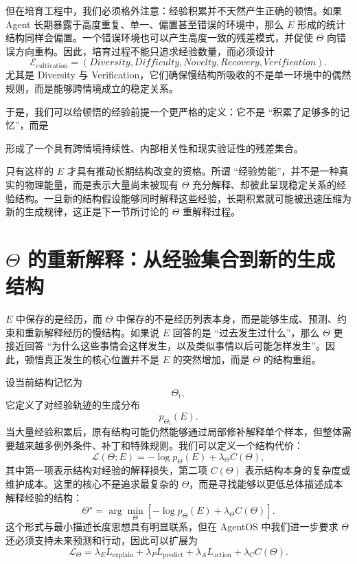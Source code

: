 但在培育工程中，我们必须格外注意：经验积累并不天然产生正确的顿悟。如果 Agent 长期暴露于高度重复、单一、偏置甚至错误的环境中，那么 $E$ 形成的统计结构同样会偏置。一个错误环境也可以产生高度一致的残差模式，并促使 $\Theta$ 向错误方向重构。因此，培育过程不能只追求经验数量，而必须设计
\[
\mathcal E_{\mathrm{cultivation}}
=
(
Diversity,
Difficulty,
Novelty,
Recovery,
Verification
).
\]
尤其是 Diversity 与 Verification，它们确保慢结构所吸收的不是单一环境中的偶然规则，而是能够跨情境成立的稳定关系。

于是，我们可以给顿悟的经验前提一个更严格的定义：它不是 ``积累了足够多的记忆''，而是
\begin{definition*}
形成了一个具有跨情境持续性、内部相关性和现实验证性的残差集合。
\end{definition*}
只有这样的 $E$ 才具有推动长期结构改变的资格。所谓 ``经验势能''，并不是一种真实的物理能量，而是表示大量尚未被现有 $\Theta$ 充分解释、却彼此呈现稳定关系的经验结构。一旦新的结构假设能够同时解释这些经验，长期积累就可能被迅速压缩为新的生成规律，这正是下一节所讨论的 $\Theta$ 重解释过程。

\section{$\Theta$ 的重新解释：从经验集合到新的生成结构}

$E$ 中保存的是经历，而 $\Theta$ 中保存的不是经历列表本身，而是能够生成、预测、约束和重新解释经历的慢结构。如果说 $E$ 回答的是 ``过去发生过什么''，那么 $\Theta$ 更接近回答 ``为什么这些事情会这样发生，以及类似事情以后可能怎样发生''。因此，顿悟真正发生的核心位置并不是 $E$ 的突然增加，而是 $\Theta$ 的结构重组。

设当前结构记忆为
\[
\Theta_t,
\]
它定义了对经验轨迹的生成分布
\[
p_{\Theta_t}(E).
\]
当大量经验积累后，原有结构可能仍然能够通过局部修补解释单个样本，但整体需要越来越多例外条件、补丁和特殊规则。我们可以定义一个结构代价：
\[
\mathcal L(\Theta;E)
=
-\log p_{\Theta}(E)
+
\lambda_{\Theta}C(\Theta),
\]
其中第一项表示结构对经验的解释损失，第二项 $C(\Theta)$ 表示结构本身的复杂度或维护成本。这里的核心不是追求最复杂的 $\Theta$，而是寻找能够以更低总体描述成本解释经验的结构：
\[
\Theta^\star
=
\arg\min_{\Theta}
\left[
-\log p_{\Theta}(E)
+
\lambda_\Theta C(\Theta)
\right].
\]
这个形式与最小描述长度思想具有明显联系，但在 AgentOS 中我们进一步要求 $\Theta$ 还必须支持未来预测和行动，因此可以扩展为
\[
\mathcal L_{\Theta}
=
\lambda_E L_{\mathrm{explain}}
+
\lambda_P L_{\mathrm{predict}}
+
\lambda_A L_{\mathrm{action}}
+
\lambda_C C(\Theta).
\]

